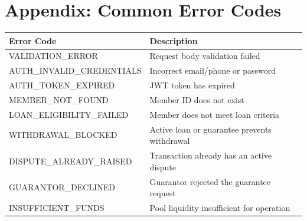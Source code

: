\documentclass[11pt,a4paper]{article}
\begin{document}
\section{Appendix: Common Error Codes}

\begin{tabular}{@{}p{5cm}p{8cm}@{}}
\toprule
\textbf{Error Code} & \textbf{Description} \\
\midrule
VALIDATION\_ERROR & Request body validation failed \\
AUTH\_INVALID\_CREDENTIALS & Incorrect email/phone or password \\
AUTH\_TOKEN\_EXPIRED & JWT token has expired \\
MEMBER\_NOT\_FOUND & Member ID does not exist \\
LOAN\_ELIGIBILITY\_FAILED & Member does not meet loan criteria \\
WITHDRAWAL\_BLOCKED & Active loan or guarantee prevents withdrawal \\
DISPUTE\_ALREADY\_RAISED & Transaction already has an active dispute \\
GUARANTOR\_DECLINED & Guarantor rejected the guarantee request \\
INSUFFICIENT\_FUNDS & Pool liquidity insufficient for operation \\
\bottomrule
\end{tabular}
\end{document}
